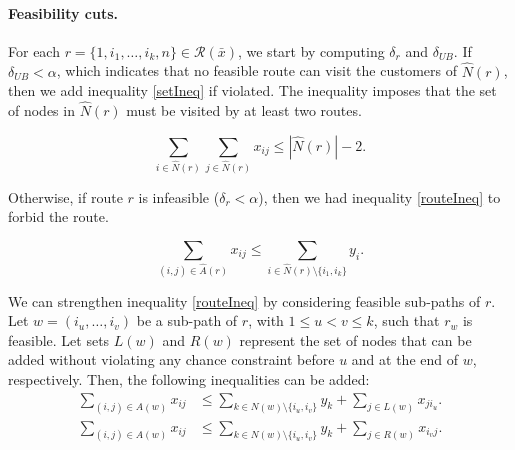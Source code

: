 \documentclass[11pt]{article}
\theoremstyle{definition}
\begin{document}


\paragraph{Feasibility cuts.} For each $r=\{1, i_1,\ldots, i_k, n\} \in \mathcal{R}(\bar{x})$, we start by computing $\delta_r$ and $\delta_{UB}$. If $\delta_{UB} < \alpha$, which indicates that no feasible route can visit the customers of $\hat{N}(r)$, then we add inequality \eqref{setIneq} if violated. The inequality imposes that the set of nodes in $\hat{N}(r)$ must be visited by at least two routes.

\begin{equation}
\label{setIneq}
  \sum_{i \in \hat{N}(r)} \sum_{j \in \hat{N}(r)} x_{ij} \leq |\hat{N}(r)| - 2.
\end{equation}

Otherwise, if route $r$ is infeasible ($\delta_r < \alpha$), then we had inequality \eqref{routeIneq} to forbid the route.

\begin{equation}
\label{routeIneq}
\sum_{(i,j) \in \hat{A}(r)} x_{ij} \leq \sum_{i \in \hat{N}(r)\setminus\{i_1,i_k\}} y_i.
\end{equation}

We can strengthen inequality \eqref{routeIneq} by considering feasible sub-paths of $r$. Let $w=(i_u,\ldots,i_v)$ be a sub-path of $r$, with $1 \leq u < v \leq k$, such that $r_w$ is feasible. Let sets $L(w)$ and $R(w)$ represent the set of nodes that can be added without violating any chance constraint before $u$ and at the end of $w$, respectively. Then, the following inequalities can be added:
%
\begin{align}
\sum_{(i,j) \in A(w)} x_{ij} & \leq \sum_{k \in N(w)\setminus\{i_u,i_v\}} y_{k} + \sum_{j \in L(w)} x_{j i_u}. \label{subpathIneq1} \\
\sum_{(i,j) \in A(w)} x_{ij} &\leq \sum_{k \in N(w)\setminus\{i_u,i_v\}} y_{k} + \sum_{j \in R(w)} x_{i_v j}. \label{subpathIneq2}
\end{align}
\end{document}
